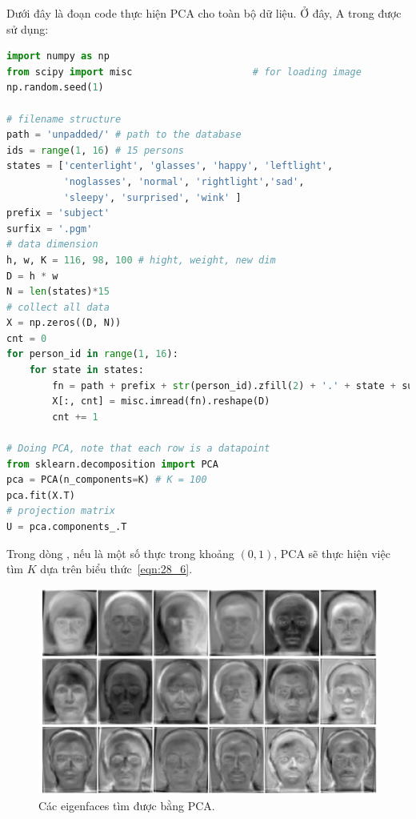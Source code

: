 Dưới đây là đoạn code thực hiện PCA cho toàn bộ dữ liệu. Ở đây, A trong  được sử dụng:
\newpage  
\begin{lstlisting}[language=Python]
import numpy as np 
from scipy import misc                     # for loading image 
np.random.seed(1) 
 
# filename structure 
path = 'unpadded/' # path to the database 
ids = range(1, 16) # 15 persons 
states = ['centerlight', 'glasses', 'happy', 'leftlight', 
          'noglasses', 'normal', 'rightlight','sad', 
          'sleepy', 'surprised', 'wink' ] 
prefix = 'subject' 
surfix = '.pgm' 
# data dimension 
h, w, K = 116, 98, 100 # hight, weight, new dim 
D = h * w 
N = len(states)*15 
# collect all data 
X = np.zeros((D, N)) 
cnt = 0 
for person_id in range(1, 16): 
    for state in states: 
        fn = path + prefix + str(person_id).zfill(2) + '.' + state + surfix 
        X[:, cnt] = misc.imread(fn).reshape(D) 
        cnt += 1 
 
# Doing PCA, note that each row is a datapoint 
from sklearn.decomposition import PCA 
pca = PCA(n_components=K) # K = 100 
pca.fit(X.T) 
# projection matrix 
U = pca.components_.T 
\end{lstlisting}
 
 
Trong dòng , nếu
 là một số thực trong khoảng $(0, 1)$, PCA sẽ thực
hiện việc tìm $K$ dựa trên biểu thức~\eqref{eqn:28_6}. 
 
\begin{figure}[t]
\centering
    \includegraphics[width = \textwidth]{Chapters/07_DimemsionalityReduction/28_pca2/latex/yaleb_eig.pdf}
    \caption[]{Các eigenfaces tìm được bằng PCA.}
    \label{fig:28_2}
\end{figure}
 
